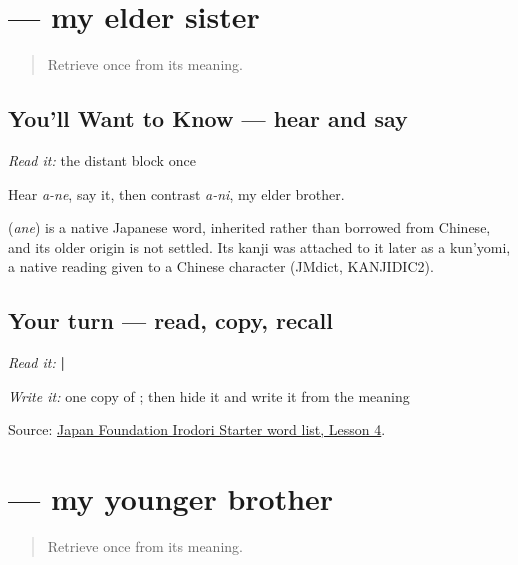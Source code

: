 \section[\texorpdfstring{\ja{あね} (ane)}{あね (ane)}]{ — my elder sister}

\label{lesson:JA-C13-ane}



\begin{quote}
Retrieve \textbf{} once from its meaning.
\end{quote}

\subsection*{You'll Want to Know — hear and say}
\emph{Read it:} the distant block \textbf{} once

Hear \emph{a-ne}, say it, then contrast \emph{a-ni}, my elder brother.

\begin{cousinweb}
\textbf{} (\emph{ane}) is a native Japanese word, inherited rather than borrowed from Chinese, and its older origin is not settled. Its kanji was attached to it later as a kun'yomi, a native reading given to a Chinese character (JMdict, KANJIDIC2).
\end{cousinweb}

\subsection*{Your turn — read, copy, recall}
\emph{Read it:} \textbf{ | }

\emph{Write it:} one copy of \textbf{}; then hide it and write it from the meaning

\begin{tcolorbox}[breakable,colback=teal!4,colframe=teal!35!black,title={Before you move on}]
Source: \href{https://www.irodori.jpf.go.jp/assets/data/wordlist\_X.pdf}{Japan Foundation Irodori Starter word list, Lesson 4}.
\end{tcolorbox}
\section[\texorpdfstring{\ja{おとうと} (otooto)}{おとうと (otooto)}]{ — my younger brother}

\label{lesson:JA-C13-otouto}



\begin{quote}
Retrieve \textbf{} once from its meaning.
\end{quote}

